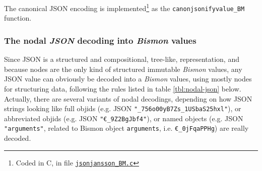 The canonical JSON encoding is implemented\footnote{Coded in C, in file
\href{https://github.com/bstarynk/bismon/blob/master/jsonjansson\_BM.c}{\texttt{jsonjansson\_BM.c}}}
as the \texttt{canonjsonifyvalue\_BM}  function.

\medskip

\subsubsection{The nodal \emph{JSON} decoding into \emph{Bismon} values}
\label{subsubsec:nodal-json-decoding}

Since JSON is a structured and compositional, 
tree-like, representation, and because  nodes are the only
kind of structured immutable \emph{Bismon} values,
  any JSON value
can obviously be decoded into a \emph{Bismon} values, using mostly
nodes for structuring data, following the rules listed in
table \ref{tbl:nodal-json} below. Actually, there are several variants of
nodal decodings, depending on how JSON strings looking like
 full objids (e.g. JSON
\texttt{"\_756o00yB7Zs\_1USbaS25hxl"}), or abbreviated objids
(e.g. JSON \texttt{"€\_9Z2BgJbf4"}), or named objects (e.g.  JSON
\texttt{"arguments"}, related to Bismon object \texttt{arguments},
i.e. \texttt{€\_0jFqaPPHg}) are really decoded.

